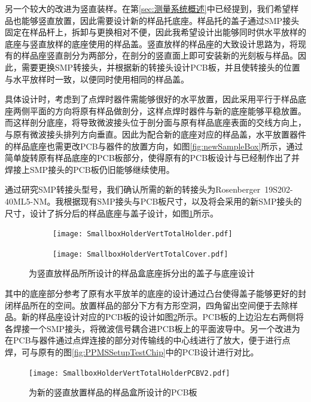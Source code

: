             另一个较大的改进为竖直装样。在第\ref{sec:测量系统概述}中已经提到，我们希望样品也能够竖直放置，因此需要设计新的样品托底座。样品托的盖子通过SMP接头固定在样品杆上，拆卸与更换相对不便，因此我希望设计出能够同时供水平放样的底座与竖直放样的底座使用的样品盖。竖直放样的样品座的大致设计思路为，将现有的样品座竖直剖分为两部分，在剖分的竖直面上即可安装新的光刻板与样品。因此，需要更换SMP转接头，并根据新的转接头设计PCB板，并且使转接头的位置与水平放样时一致，以便同时使用相同的样品盖。


            具体设计时，考虑到了点焊时器件需能够很好的水平放置，因此采用平行于样品底座两侧平面的方向将原有样品做剖分，这样点焊时器件与新的底座能够平稳放置。而这样剖分底座，将导致微波接头位于剖分面与原有样品底座表面的交线方向上，与原有微波接头排列方向垂直。因此为配合新的底座对应的样品盖，水平放置器件的样品底座也需更改PCB与器件的放置方向，如图\ref{fig:newSampleBox}所示，通过简单旋转原有样品底座的PCB板部分，使得原有的PCB板设计与已经制作出了并焊接上SMP接头的PCB板仍旧能够继续使用。

            通过研究SMP转接头型号，我们确认所需的新的转接头为Rosenberger~19S202-40ML5-NM。我根据现有SMP接头与PCB板尺寸，以及将会采用的新SMP接头的尺寸，设计了拆分后的样品底座与盖子设计，如图\ref{fig:newVertiSampleBox}所示。


\begin{figure}[h]
  \centering%
  \begin{subfigure}{0.4\textwidth}
    \texttt{[image: SmallboxHolderVertTotalHolder.pdf]}
  \end{subfigure}%
  \begin{subfigure}{0.4\textwidth}
    \texttt{[image: SmallboxHolderVertTotalCover.pdf]}
  \end{subfigure}
  \caption{为竖直放样品所所设计的样品盒底座拆分出的盖子与底座设计}
  \label{fig:newVertiSampleBox}
\end{figure}


            其中的底座部分参考了原有水平放羊的底座的设计通过凸台使得盖子能够更好的封闭样品所在的空间。放置样品的部分下方有方形空洞，四角留出空间便于去除样品。新的样品座设计对应的PCB板的设计如图\ref{fig:SmallboxHolderVertTotalHolderPCBV2}所示。PCB板的上边沿左右两侧将各焊接一个SMP接头，将微波信号耦合进PCB板上的平面波导中。另一个改进为在PCB与器件通过点焊连接的部分对传输线的中心线进行了放大，便于进行点焊，可与原有的图\ref{fig:PPMSSetupTestChip}中的PCB设计进行对比。
                  


\begin{figure}[h]
  \centering%
  \texttt{[image: SmallboxHolderVertTotalHolderPCBV2.pdf]}
  \caption{为新的竖直放置样品的样品盒所设计的PCB板}
  \label{fig:SmallboxHolderVertTotalHolderPCBV2}
\end{figure}










